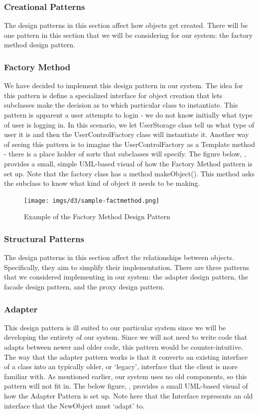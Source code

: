 \documentclass[12pt,letterpaper]{article}
\begin{document}
\subsubsection{Creational Patterns}
The design patterns in this section affect how objects get created. There will be one pattern in this section that we will be considering for our system: the factory method design pattern. 

\subsubsection*{Factory Method}
We have decided to implement this design pattern in our system. The idea for this pattern is define a specialized interface for object creation that lets subclasses make the decision as to which particular class to instantiate. This pattern is apparent a user attempts to login - we do not know initially what type of user is logging in. In this scenario, we let UserStorage class tell us what type of user it is and then the UserControlFactory class will instantiate it. Another way of seeing this pattern is to imagine the UserControlFactory as a Template method - there is a place holder of sorts that subclasses will specify. The figure below, , provides a small, simple UML-based visual of how the Factory Method pattern is set up. Note that the factory class has a method makeObject(). This method asks the subclass to know what kind of object it needs to be making.

\begin{figure}[H]
	\centering{}
	\texttt{[image: imgs/d3/sample-factmethod.png]}
	\caption{Example of the Factory Method Design Pattern}
\end{figure}

\subsubsection{Structural Patterns}
The design patterns in this section affect the relationships between objects. Specifically, they aim to simplify their implementation. There are three patterns that we considered implementing in our system: the adapter design pattern, the facade design pattern, and the proxy design pattern.

\subsubsection*{Adapter}
This design pattern is ill suited to our particular system since we will be developing the entirety of our system. Since we will not need to write code that adapts between newer and older code, this pattern would be counter-intuitive. The way that the adapter pattern works is that it converts an existing interface of a class into an typically older, or `legacy', interface that the client is more familiar with. As mentioned earlier, our system uses no old components, so this pattern will not fit in. The below figure, , provides a small UML-based visual of how the Adapter Pattern is set up. Note here that the Interface represents an old interface that the NewObject must `adapt' to.
\end{document}
